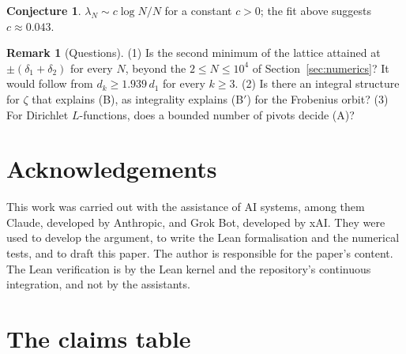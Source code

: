 \documentclass[11pt]{article}
\theoremstyle{definition}
\newtheorem{conjecture}{Conjecture}
\newtheorem*{remark}{Remark}
\begin{document}
\begin{conjecture}
$\lambda_N \sim c \log N/N$ for a constant $c > 0$; the fit above suggests $c \approx 0.043$.
\end{conjecture}

\begin{remark}[Questions]
(1) Is the second minimum of the lattice attained at $\pm(\delta_1
+ \delta_2)$ for every $N$, beyond the $2 \le N \le 10^4$
of Section~\ref{sec:numerics}? It would follow from $d_k \ge 1.939\,d_1$ for every $k \ge 3$. (2) Is there an
integral structure for $\zeta$ that explains (B), as integrality explains (B$'$) for the Frobenius orbit? (3) For
Dirichlet $L$-functions, does a bounded number of pivots decide (A)?
\end{remark}

\section*{Acknowledgements}

This work was carried out with the assistance of AI systems, among them Claude, developed by Anthropic, and Grok Bot,
developed by xAI. They were used to develop the argument, to write the Lean formalisation and the numerical tests, and
to draft this paper. The author is responsible for the paper's content. The Lean verification is by the Lean kernel and
the repository's continuous integration, and not by the assistants.

\appendix

\section{The claims table}\label{app:claims}
\end{document}
